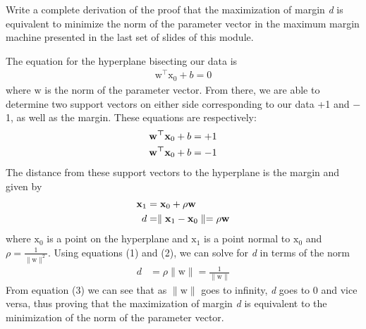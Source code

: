 \documentclass[11pt]{article}
\begin{document}






Write a complete derivation of the proof that the maximization of margin \textit{d} is equivalent to minimize the norm of the parameter vector in the maximum margin machine presented in the last set of slides of this module.

\begin{tcolorbox}[colback=CrispBlue!5!white,colframe=CrispBlue!75!black,title=\ ]
    The equation for the hyperplane bisecting our data is
\begin{align}
	\bm{\mathrm{w^\top x}}_{0}+b=0
\end{align}
where \( \bm{\mathrm{w}} \) is the norm of the parameter vector. From there, we are able to determine two support vectors on either side corresponding to our data +1 and \(-\)1, as well as the margin. These equations are respectively:
\begin{align}
	\notag\bm{\mathrm{w^\top x}}_{0}+b&=+1\\
	\notag\bm{\mathrm{w^\top x}}_{0}+b&=-1
\end{align}
The distance from these support vectors to the hyperplane is the margin and given by
\begin{align}
	\notag\bm{\mathrm{x}}_1 &=\bm{\mathrm{x}}_{0}+\rho\bm{\mathrm{w}}\\
	d&=\parallel\bm{\mathrm{x}}_1-\bm{\mathrm{x}}_{0}\parallel=\rho\bm{\mathrm{w}}
\end{align}
where \(\bm{\mathrm{x}}_{0}\) is a point on the hyperplane and \(\bm{\mathrm{x_1}}\) is a point normal to \(\bm{\mathrm{x}}_{0}\) and \(\rho=\frac{1}{\parallel\bm{\mathrm{w}}\parallel^2}\). Using equations (1) and (2), we can solve for \textit{d} in terms of the norm
\begin{align}
	d&=\rho\parallel\bm{\mathrm{w}}\parallel=\frac{1}{\parallel\bm{\mathrm{w}}\parallel}
\end{align}
From equation (3) we can see that as \(\parallel\bm{\mathrm{w}}\parallel \) goes to infinity, \textit{d} goes to 0 and vice versa, thus proving that the maximization of margin \textit{d} is equivalent to the minimization of the norm of the parameter vector.
\end{tcolorbox}
\end{document}
